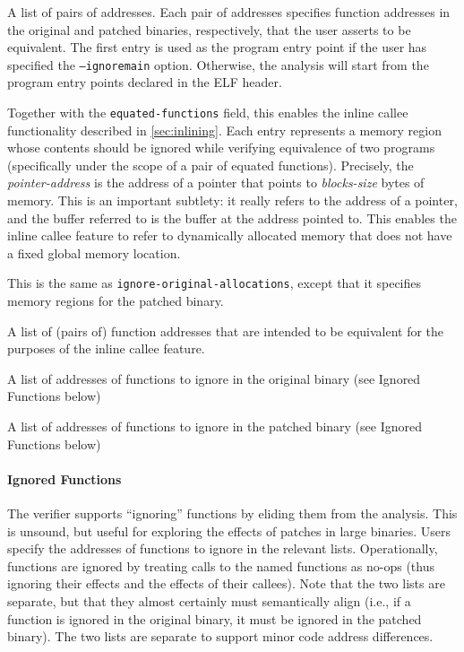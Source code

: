 \begin{description}[style=nextline]
\item[\texttt{patch-pairs}] A list of pairs of addresses. Each pair of addresses specifies function addresses in the original and patched binaries, respectively, that the user asserts to be equivalent. The first entry is used as the program entry point if the user has specified the \texttt{--ignoremain} option.  Otherwise, the analysis will start from the program entry points declared in the ELF header.
\item[\texttt{ignore-original-allocations}] Together with the \texttt{equated-functions} field, this enables the inline callee functionality described in \cref{sec:inlining}. Each entry represents a memory region whose contents should be ignored while verifying equivalence of two programs (specifically under the scope of a pair of equated functions).  Precisely, the \emph{pointer-address} is the address of a pointer that points to \emph{blocks-size} bytes of memory. This is an important subtlety: it really refers to the address of a pointer, and the buffer referred to is the buffer at the address pointed to. This enables the inline callee feature to refer to dynamically allocated memory that does not have a fixed global memory location.
\item[\texttt{ignore-patched-allocations}] This is the same as \texttt{ignore-original-allocations}, except that it specifies memory regions for the patched binary.
\item[\texttt{equated-functions}] A list of (pairs of) function addresses that are intended to be equivalent for the purposes of the inline callee feature.
\item[\texttt{ignore-original-functions}] A list of addresses of functions to ignore in the original binary (see Ignored Functions below)
\item[\texttt{ignore-patched-functions}] A list of addresses of functions to ignore in the patched binary (see Ignored Functions below)
\end{description}

\paragraph{Ignored Functions} The verifier supports ``ignoring'' functions by eliding them from the analysis. This is unsound, but useful for exploring the effects of patches in large binaries. Users specify the addresses of functions to ignore in the relevant lists. Operationally, functions are ignored by treating calls to the named functions as no-ops (thus ignoring their effects and the effects of their callees). Note that the two lists are separate, but that they almost certainly must semantically align (i.e., if a function is ignored in the original binary, it must be ignored in the patched binary). The two lists are separate to support minor code address differences.

